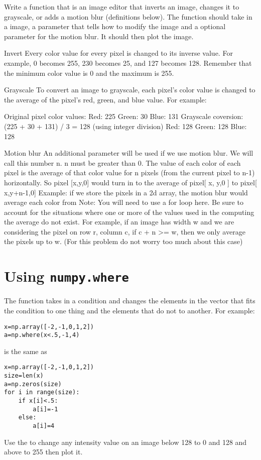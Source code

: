 \begin{problem}
Write a function that is an image editor that inverts an image, changes it to grayscale, 
or adds a motion blur (definitions below). 
The function should take in a image, a parameter that tells how to modify the image 
and a optional parameter for the motion blur. It should then plot the image. 
\end{problem}

Invert
Every color value for every pixel is changed to its inverse value. For example, 0 
becomes 255, 230 becomes 25, and 127 becomes 128. Remember that the minimum 
color value is 0 and the maximum is 255.

Grayscale
To convert an image to grayscale, each pixel’s color value is changed to the average of 
the pixel’s red, green, and blue value. For example:

Original pixel color values:
Red: 225 Green: 30 Blue: 131
Grayscale coversion: (225 + 30 + 131) / 3 = 128 (using integer division)
Red: 128 Green: 128 Blue: 128

Motion blur
An additional parameter will be used if we use motion blur. We will call this number n. n must be greater than 0.
The value of each color of each pixel is the average of that color value for n pixels (from 
the current pixel to n-1) horizontally. So pixel [x,y,0] would turn in to the average of
pixel[ x, y,0 ] to pixel[ x,y+n-1,0] 
Example: if we store the pixels in a 2d array, the motion blur would average each color 
from Note: You will need to use a for loop here.
Be sure to account for the situations where one or more of the values used in the 
computing the average do not exist. For example, if an image has width w and we are 
considering the pixel on row r, column c, if c + n >= w, then we only average the pixels 
up to w. (For this problem do not worry too much about this case)

\section*{Using \texttt{numpy.where}}
The  function takes in a condition and changes the elements in the 
vector that fits the condition to one thing and the elements that do not to another. 
For example:
\begin{lstlisting}
x=np.array([-2,-1,0,1,2])
a=np.where(x<.5,-1,4)
\end{lstlisting}
is the same as
\begin{lstlisting}
x=np.array([-2,-1,0,1,2])
size=len(x)
a=np.zeros(size)
for i in range(size):
    if x[i]<.5:
        a[i]=-1
    else:
        a[i]=4
\end{lstlisting}

\begin{problem}
Use the  to change any intensity value on an image below 128 to 0 and 128 and above to 255 then plot it.
\end{problem}
